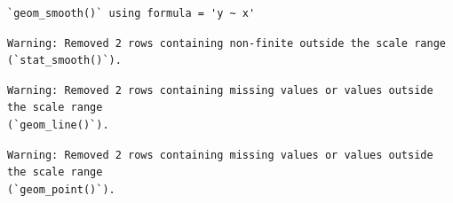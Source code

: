 \documentclass[
  letterpaper,
  DIV=11,
  numbers=noendperiod]{scrartcl}
\newenvironment{Shaded}{\begin{snugshade}}{\end{snugshade}}
\newcommand{\AttributeTok}[1]{\textcolor[rgb]{0.40,0.45,0.13}{#1}}
\newcommand{\ConstantTok}[1]{\textcolor[rgb]{0.56,0.35,0.01}{#1}}
\newcommand{\DecValTok}[1]{\textcolor[rgb]{0.68,0.00,0.00}{#1}}
\newcommand{\FloatTok}[1]{\textcolor[rgb]{0.68,0.00,0.00}{#1}}
\newcommand{\FunctionTok}[1]{\textcolor[rgb]{0.28,0.35,0.67}{#1}}
\newcommand{\NormalTok}[1]{\textcolor[rgb]{0.00,0.23,0.31}{#1}}
\newcommand{\SpecialCharTok}[1]{\textcolor[rgb]{0.37,0.37,0.37}{#1}}
\newcommand{\StringTok}[1]{\textcolor[rgb]{0.13,0.47,0.30}{#1}}
\begin{document}
\begin{Shaded}
\end{Shaded}

\begin{verbatim}
`geom_smooth()` using formula = 'y ~ x'
\end{verbatim}

\begin{verbatim}
Warning: Removed 2 rows containing non-finite outside the scale range
(`stat_smooth()`).
\end{verbatim}

\begin{verbatim}
Warning: Removed 2 rows containing missing values or values outside the scale range
(`geom_line()`).
\end{verbatim}

\begin{verbatim}
Warning: Removed 2 rows containing missing values or values outside the scale range
(`geom_point()`).
\end{verbatim}
\end{document}
